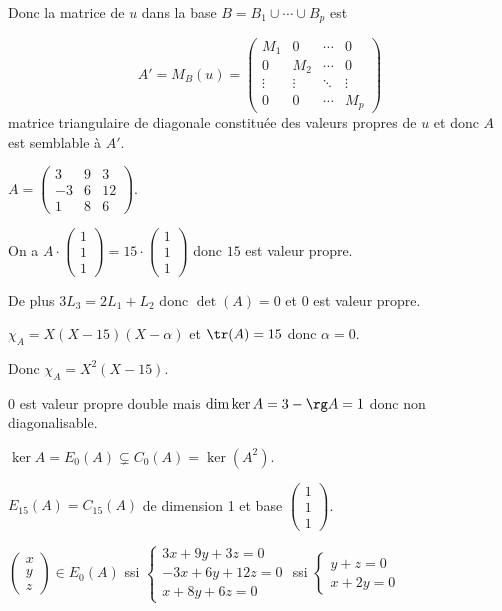 Donc la matrice de $u$ dans la base $B = B_1 \cup \cdots \cup B_p$ est 

$$A' = M_B(u) = \begin{pmatrix}
    M_1 & 0 & \cdots & 0 \\
    0 & M_2 & \cdots & 0 \\
    \vdots & \vdots & \ddots & \vdots \\
    0 & 0 & \cdots & M_p
\end{pmatrix}$$ matrice triangulaire de diagonale constituée des valeurs propres de $u$
et donc $A$ est semblable à $A'$. 

\begin{exemple}
    $A = \begin{pmatrix}
        3 & 9 & 3 \\
        -3 & 6 & 12 \\
        1 & 8 & 6
    \end{pmatrix}$.

    On a $A \cdot \begin{pmatrix}
        1 \\ 1 \\ 1
    \end{pmatrix} = 15 \cdot \begin{pmatrix}
        1 \\ 1 \\ 1
    \end{pmatrix}$ donc $15$ est valeur propre.

    De plus $3 L_3 = 2 L_1 + L_2$ donc $\det(A) = 0$ et $0$ est valeur propre.

    $\chi_A = X(X - 15)(X - \alpha)$ et $\tr(A) = 15$ donc $\alpha = 0$.

    Donc $\chi_A = X^2 (X - 15)$. 

    $0$ est valeur propre double mais $\dim \ker A = 3 - \rg A = 1$ donc non diagonalisable.

    $\ker A = E_0(A) \subsetneq C_0(A) = \ker (A^2)$.

    $E_{15}(A) = C_{15}(A)$ de dimension 1 et base $\begin{pmatrix}
        1 \\ 1 \\ 1
    \end{pmatrix}$.

    $\begin{pmatrix}
        x \\ y \\ z
    \end{pmatrix} \in E_0(A)$ ssi $\begin{cases}
        3x + 9y + 3z = 0 \\
        -3x + 6y + 12z = 0 \\
        x + 8y + 6z = 0
    \end{cases}$ ssi $\begin{cases}
        y + z = 0 \\
        x + 2y = 0
    \end{cases}$


\end{exemple}
